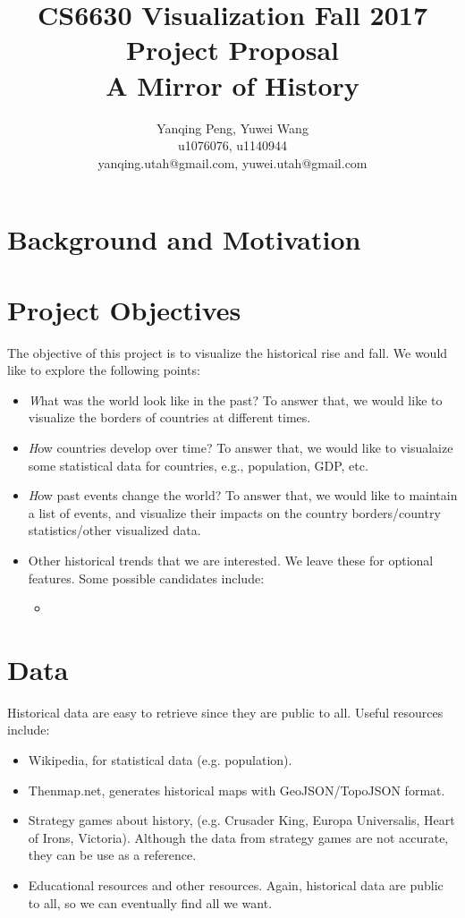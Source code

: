 \documentclass{article}
\title{CS6630 Visualization Fall 2017 Project Proposal\\ A Mirror of History}
\author{Yanqing Peng, Yuwei Wang \\ u1076076, u1140944 \\ yanqing.utah@gmail.com, yuwei.utah@gmail.com}
\begin{document}
\maketitle
\section{Background and Motivation}

\section{Project Objectives}
The objective of this project is to visualize the historical rise and fall.
We would like to explore the following points:
\begin{itemize}
    \item {\emph What was the world look like in the past?} To answer that, we would like to visualize the borders of countries at different times.
    \item {\emph How countries develop over time?} To answer that, we would like to visualaize some statistical data for countries, e.g., population, GDP, etc.
    \item {\emph How past events change the world?} To answer that, we would like to maintain a list of events, and visualize their impacts on the country borders/country statistics/other visualized data.
    \item Other historical trends that we are interested. We leave these for optional features. Some possible candidates include:
        \begin{itemize}
            \item 
        \end{itemize}

\end{itemize}
\section{Data}
Historical data are easy to retrieve since they are public to all. Useful resources include:
\begin{itemize}
    \item Wikipedia, for statistical data (e.g. population).
    \item Thenmap.net, generates historical maps with GeoJSON/TopoJSON format.
    \item Strategy games about history, (e.g. Crusader King, Europa Universalis, Heart of Irons, Victoria). Although the data from strategy games are not accurate, they can be use
        as a reference.
    \item Educational resources and other resources. Again, historical data are public to all, so we can eventually find all we want.
\end{itemize}
\end{document}
